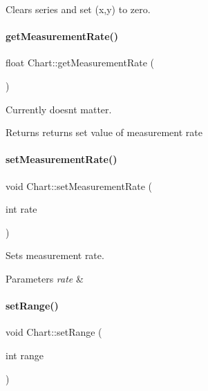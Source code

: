 Clears series and set (x,y) to zero. 

\mbox{\label{classChart_a0636026f9baa6bbdc51a83fdad4db109}} 
\paragraph{\texorpdfstring{get\+Measurement\+Rate()}{getMeasurementRate()}}
{\footnotesize\ttfamily float Chart\+::get\+Measurement\+Rate (\begin{DoxyParamCaption}{ }\end{DoxyParamCaption})}



Currently doesn\textquotesingle{}t matter. 

\begin{DoxyReturn}{Returns}
returns set value of measurement rate 
\end{DoxyReturn}
\mbox{\label{classChart_af996c93e298c33c8eeaead89d9933c15}} 
\paragraph{\texorpdfstring{set\+Measurement\+Rate()}{setMeasurementRate()}}
{\footnotesize\ttfamily void Chart\+::set\+Measurement\+Rate (\begin{DoxyParamCaption}\item[{int}]{rate }\end{DoxyParamCaption})}



Sets measurement rate. 


\begin{DoxyParams}{Parameters}
{\em rate} & \\
\hline
\end{DoxyParams}
\mbox{\label{classChart_a445baba8efcb1c0bea7f7f16e2d5b1e9}} 
\paragraph{\texorpdfstring{set\+Range()}{setRange()}}
{\footnotesize\ttfamily void Chart\+::set\+Range (\begin{DoxyParamCaption}\item[{int}]{range }\end{DoxyParamCaption})}



